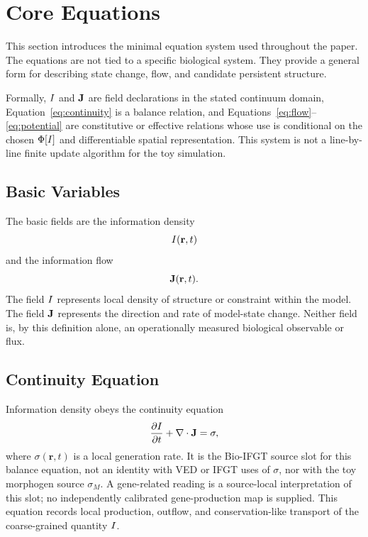 \section{Core Equations}

This section introduces the minimal equation system used throughout the paper. The equations are not tied to a specific biological system. They provide a general form for describing state change, flow, and candidate persistent structure.

Formally, \(I\) and \(\mathbf{J}\) are field declarations in the stated continuum domain, Equation~\eqref{eq:continuity} is a balance relation, and Equations~\eqref{eq:flow}--\eqref{eq:potential} are constitutive or effective relations whose use is conditional on the chosen \(\Phi[I]\) and differentiable spatial representation. This system is not a line-by-line finite update algorithm for the toy simulation.

\subsection{Basic Variables}

The basic fields are the information density
\begin{equation}
  I(\mathbf{r},t)
\end{equation}
and the information flow
\begin{equation}
  \mathbf{J}(\mathbf{r},t).
\end{equation}
The field \(I\) represents local density of structure or constraint within the model. The field \(\mathbf{J}\) represents the direction and rate of model-state change. Neither field is, by this definition alone, an operationally measured biological observable or flux.

\subsection{Continuity Equation}

Information density obeys the continuity equation
\begin{equation}
  \frac{\partial I}{\partial t} + \nabla \cdot \mathbf{J} = \sigma,
  \label{eq:continuity}
\end{equation}
where \(\sigma(\mathbf{r},t)\) is a local generation rate. It is the Bio-IFGT source slot for this balance equation, not an identity with VED or IFGT uses of \(\sigma\), nor with the toy morphogen source \(\sigma_M\). A gene-related reading is a source-local interpretation of this slot; no independently calibrated gene-production map is supplied. This equation records local production, outflow, and conservation-like transport of the coarse-grained quantity \(I\).

